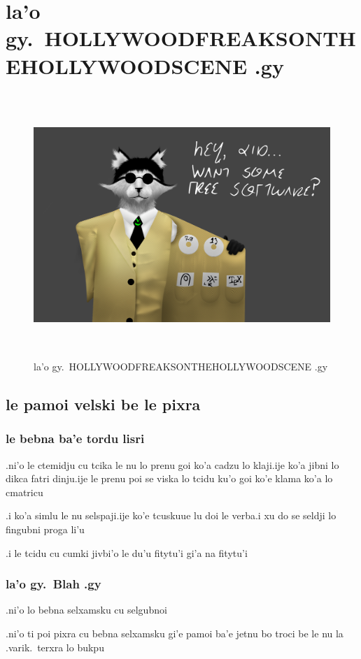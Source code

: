 \documentclass{report}
\newcommand\imageheight{10cm}
\begin{document}
\chapter{la'o gy.\ HOLLYWOODFREAKSONTHEHOLLYWOODSCENE .gy}
\begin{figure}[ht]
	\centering
	\includegraphics[height=\imageheight]{hollywoodfreaksonthehollywoodscene/hollywoodfreaksonthehollywoodscene.png}
	\caption[center]{la'o gy.\ HOLLYWOODFREAKSONTHEHOLLYWOODSCENE .gy}
\end{figure}
\section{le pamoi velski be le pixra}
\subsection{le bebna ba'e tordu lisri}
.ni'o le ctemidju cu tcika le nu lo prenu goi ko'a cadzu lo klaji\@  .ije ko'a jibni lo dikca fatri dinju\@  .ije le prenu poi se viska lo tcidu ku'o goi ko'e klama ko'a lo cmatricu

.i ko'a simlu le nu selspaji\@  .ije ko'e tcuskuue lu doi le verba\@  .i xu do se seldji lo fingubni proga li'u

.i le tcidu cu cumki jivbi'o le du'u fitytu'i gi'a na fitytu'i

\subsection{la'o gy.\ Blah .gy}
.ni'o lo bebna selxamsku cu selgubnoi

.ni'o ti poi pixra cu bebna selxamsku gi'e pamoi ba'e jetnu bo troci be le nu la .varik.\ terxra lo bukpu
\end{document}
